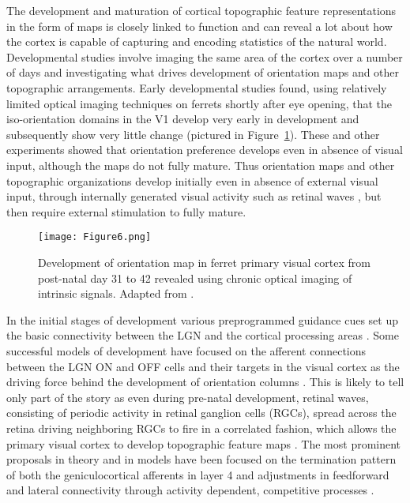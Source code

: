The development and maturation of cortical topographic feature
representations in the form of maps is closely linked to function and
can reveal a lot about how the cortex is capable of capturing and
encoding statistics of the natural world. Developmental studies
involve imaging the same area of the cortex over a number of days and
investigating what drives development of orientation maps and other
topographic arrangements. Early developmental studies found, using
relatively limited optical imaging techniques on ferrets shortly after
eye opening, that the iso-orientation domains in the V1 develop very
early in development and subsequently show very little change
\citep{Chapman1996} (pictured in Figure~\ref{RFMapDevelopment}). These
and other experiments \citep{White2007} showed that orientation
preference develops even in absence of visual input, although the maps
do not fully mature. Thus orientation maps and other topographic
organizations develop initially even in absence of external visual
input, through internally generated visual activity such as retinal
waves \citep{Cang2005}, but then require external stimulation to fully
mature.

\begin{figure}
	\centering \texttt{[image: Figure6.png]}
	\caption[Development of an orientation map in ferret V1. Adapted
      from \cite{Chapman1996}.]{Development of orientation map in
      ferret primary visual cortex from post-natal day 31 to 42
      revealed using chronic optical imaging of intrinsic
      signals. Adapted from \cite{Chapman1996}.}
	\label{RFMapDevelopment}
\end{figure}

In the initial stages of development various preprogrammed guidance
cues set up the basic connectivity between the LGN and the cortical
processing areas \citep{Huberman2008}. Some successful models of
development have focused on the afferent connections between the LGN
ON and OFF cells and their targets in the visual cortex as the driving
force behind the development of orientation columns
\citep{Jin2011}. This is likely to tell only part of the story as even
during pre-natal development, retinal waves, consisting of periodic
activity in retinal ganglion cells (RGCs), spread across the retina
driving neighboring RGCs to fire in a correlated fashion, which allows
the primary visual cortex to develop topographic feature maps
\citep{Firth2005}. The most prominent proposals in theory and in
models have been focused on the termination pattern of both the
geniculocortical afferents in layer 4 \citep{Katz2000,Ringach2007} and
adjustments in feedforward and lateral connectivity through activity
dependent, competitive processes \citep{Bednar2003}.

